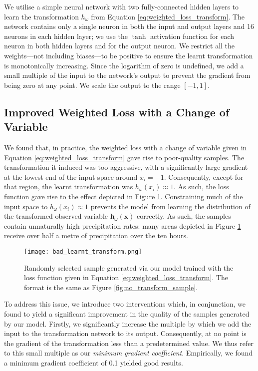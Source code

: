 \documentclass[ oneside,%
                    author={George Herbert},
                    degree={MSci},
                     title={Video Diffusion Models for Climate Simulations},
                  subtitle={}]{dissertation}
\begin{document}
We utilise a simple neural network with two fully-connected hidden layers to learn the transformation $h_\omega$ from Equation \ref{eq:weighted_loss_transform}. The network contains only a single neuron in both the input and output layers and 16 neurons in each hidden layer; we use the $\tanh$ activation function for each neuron in both hidden layers and for the output neuron. We restrict all the weights---not including biases---to be positive to ensure the learnt transformation is monotonically increasing. Since the logarithm of zero is undefined, we add a small multiple of the input to the network's output to prevent the gradient from being zero at any point. We scale the output to the range $[-1,1]$.

\subsection{Improved Weighted Loss with a Change of Variable}

We found that, in practice, the weighted loss with a change of variable given in Equation \ref{eq:weighted_loss_transform} gave rise to poor-quality samples. The transformation it induced was too aggressive, with a significantly large gradient at the lowest end of the input space around $x_i=-1$. Consequently, except for that region, the learnt transformation was $h_\omega(x_i)\approx 1$. As such, the loss function gave rise to the effect depicted in Figure \ref{fig:bad_learnt_transform}. Constraining much of the input space to $h_\omega(x_i)\approx 1$ prevents the model from learning the distribution of the transformed observed variable $\mathbf{h}_\omega(\mathbf{x})$ correctly. As such, the samples contain unnaturally high precipitation rates: many areas depicted in Figure \ref{fig:bad_learnt_transform} receive over half a metre of precipitation over the ten hours.

\begin{figure}[htbp]
      \centering
      \texttt{[image: bad\_learnt\_transform.png]}
      \caption{Randomly selected sample generated via our model trained with the loss function given in Equation \ref{eq:weighted_loss_transform}. The format is the same as Figure \ref{fig:no_transform_sample}.}
      \label{fig:bad_learnt_transform}
\end{figure}

To address this issue, we introduce two interventions which, in conjunction, we found to yield a significant improvement in the quality of the samples generated by our model. Firstly, we significantly increase the multiple by which we add the input to the transformation network to its output. Consequently, at no point is the gradient of the transformation less than a predetermined value. We thus refer to this small multiple as our \textit{minimum gradient coefficient}. Empirically, we found a minimum gradient coefficient of 0.1 yielded good results.
\end{document}
